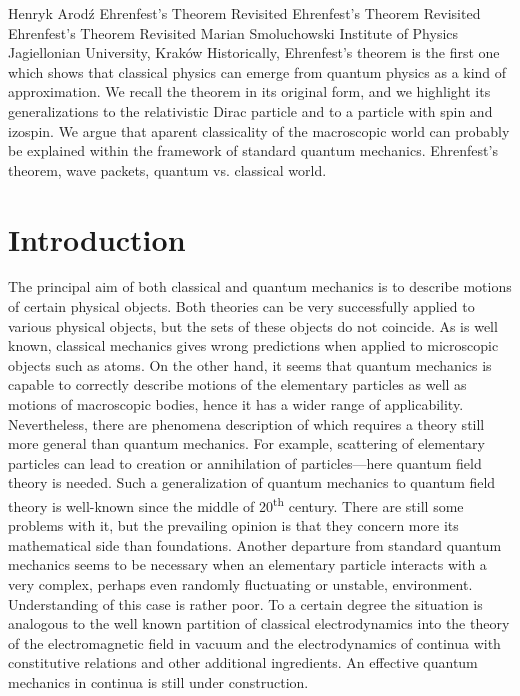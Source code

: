 \begin{artengenv}{Henryk Arod\'z}
	{Ehrenfest's Theorem Revisited}
	{Ehrenfest's Theorem Revisited}
	{Ehrenfest's Theorem Revisited}
	{Marian Smoluchowski Institute of Physics \\ Jagiellonian University, Krak\'ow\label{arodz-start}}
	{Historically, Ehrenfest's theorem \parencite*{ehr} is the first one which shows that classical physics can emerge from quantum physics as a kind of approximation. We recall the theorem in its original form, and we highlight its generalizations to the relativistic Dirac particle and to a particle with spin and izospin. We argue that aparent classicality of the macroscopic world can probably be explained within the framework of standard quantum mechanics.}
	{Ehrenfest's theorem, wave packets, quantum vs. classical world.}







\section{Introduction}


\lettrine[loversize=0.13,lines=2,lraise=-0.05,nindent=0em,findent=0.2pt]%
{T}{}he principal aim of both classical and quantum mechanics is to describe motions of certain physical objects. Both theories can be very successfully applied to various physical objects, but the sets of these objects do not coincide. As is well known, classical mechanics gives wrong predictions when applied to microscopic objects such as atoms. On the other hand, it seems that quantum mechanics is capable to correctly describe motions of the elementary particles as well as motions of macroscopic bodies, hence it has a wider range of applicability. Nevertheless, there are phenomena description of which requires a theory still more general than quantum mechanics. For example, scattering of elementary particles can lead to creation or annihilation of particles---here quantum field theory is needed. Such a generalization of quantum mechanics to quantum field theory is well-known since the middle of 20\textsuperscript{th} century. There are still some problems with it, but the prevailing opinion is that they concern more its mathematical side than foundations. Another departure from standard quantum mechanics seems to be necessary when an elementary particle interacts with a very complex, perhaps even randomly fluctuating or unstable, environment. Understanding of this case is rather poor. To a certain degree the situation is analogous to the well known partition of classical electrodynamics into the theory of the electromagnetic field in vacuum and the electrodynamics of 
continua with constitutive relations and other additional ingredients. An effective quantum mechanics in continua is still 
under construction. 






\end{artengenv}
